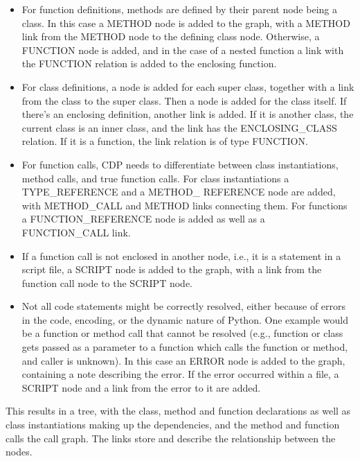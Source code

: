 \documentclass[a4paper,11pt,twoside]{article}
\theoremstyle{definition} %
\begin{document}
\begin{itemize}
  \item For function definitions, methods are defined by their parent node being a class. In this case a METHOD node is added to the graph, with a METHOD link from the METHOD node to the defining class node. Otherwise, a FUNCTION node is added, and in the case of a nested function a link with the FUNCTION relation is added to the enclosing function. 

\item For class definitions, a node is added for each super class, together with a link from the class to the super class. Then a node is added for the class itself. If there’s an enclosing definition, another link is added. If it is another class, the current class is an inner class, and the link has the ENCLOSING\_CLASS relation. If it is a function, the link relation is of type FUNCTION. 

\item For function calls, CDP needs to differentiate between class instantiations, method calls, and true function calls. For class instantiations a TYPE\_REFERENCE and a METHOD\_ REFERENCE node are added, with METHOD\_CALL and METHOD links connecting them. For functions a FUNCTION\_REFERENCE node is added as well as a FUNCTION\_CALL link. 

\item If a function call is not enclosed in another node, i.e., it is a statement in a script file, a SCRIPT node is added to the graph, with a link from the function call node to the SCRIPT node. 

\item Not all code statements might be correctly resolved, either because of errors in the code, encoding, or the dynamic nature of Python. One example would be a function or method call that cannot be resolved (e.g., function or class gets passed as a parameter to a function which calls the function or method, and caller is unknown). In this case an ERROR node is added to the graph, containing a note describing the error. If the error occurred within a file, a SCRIPT node and a link from the error to it are added.
\end{itemize}

This results in a tree, with the class, method and function declarations as well as class instantiations making up the dependencies, and the method and function calls the call graph. The links store and describe the relationship between the nodes. 
\end{document}
